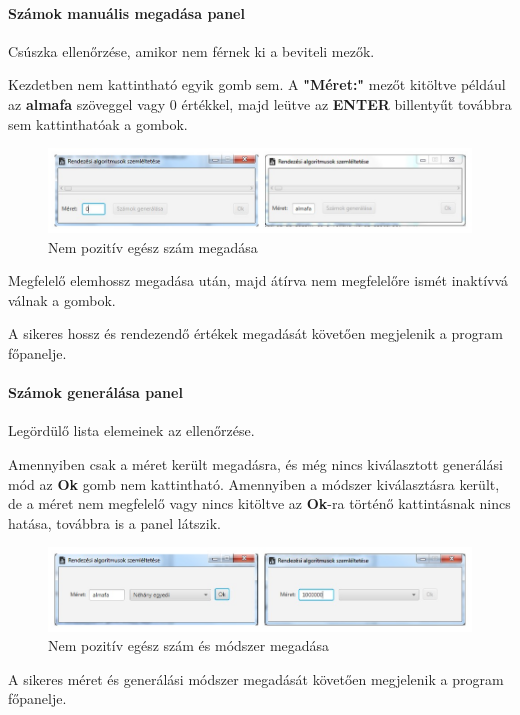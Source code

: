 \documentclass{elteikthesis}
\begin{document}
\paragraph{Számok manuális megadása panel}
Csúszka ellenőrzése, amikor nem férnek ki a beviteli mezők.\par
Kezdetben nem kattintható egyik gomb sem. A \textbf{"Méret:"} mezőt kitöltve például az \textbf{almafa} szöveggel vagy 0 értékkel, majd leütve az \textbf{ENTER} billentyűt továbbra sem kattinthatóak a gombok.
\begin{figure}[H]
	\centering
	\includegraphics[width=\textwidth]{pics/test/manual_almafa0.jpg}
	\caption{Nem pozitív egész szám megadása}
\end{figure}
Megfelelő elemhossz megadása után, majd átírva nem megfelelőre ismét inaktívvá válnak a gombok.\par
A sikeres hossz és rendezendő értékek megadását követően megjelenik a program főpanelje.
\paragraph{Számok generálása panel}
Legördülő lista elemeinek az ellenőrzése.\par
Amennyiben csak a méret került megadásra, és még nincs kiválasztott generálási mód az \textbf{Ok} gomb nem kattintható. Amennyiben a módszer kiválasztásra került, de a méret nem megfelelő vagy nincs kitöltve az \textbf{Ok}-ra történő kattintásnak nincs hatása, továbbra is a panel látszik.
\begin{figure}[H]
	\centering
	\includegraphics[width=\textwidth]{pics/test/generate_notselectedalmafa.jpg}
	\caption{Nem pozitív egész szám és módszer megadása}
\end{figure}
A sikeres méret és generálási módszer megadását követően megjelenik a program főpanelje.
\end{document}
